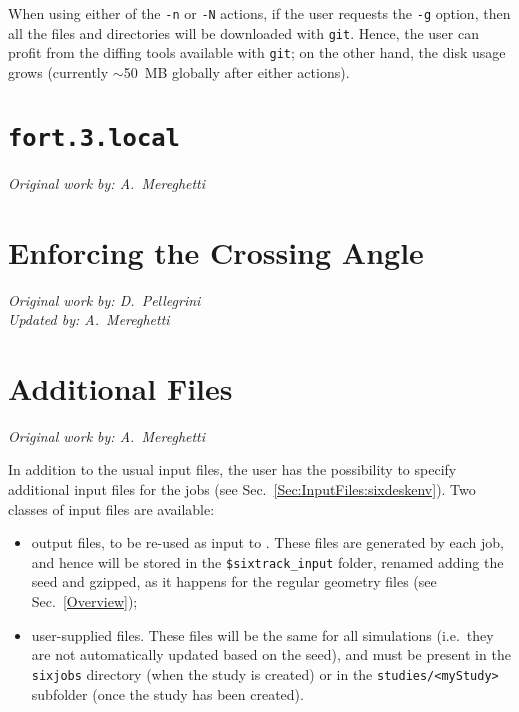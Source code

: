 When using either of the \texttt{-n} or \texttt{-N} actions,
if the user requests the \texttt{-g} option, then all the files
and directories will be downloaded with \texttt{git}. Hence, the
user can profit from the diffing tools available with \texttt{git};
on the other hand, the disk usage grows (currently $\sim$50~MB
globally after either actions).

\section{\texttt{fort.3.local}} \label{fort3local}
\begin{flushright}
\emph{Original work by: A.~Mereghetti}
\end{flushright}

\section{Enforcing the Crossing Angle} \label{EnforceXingAngle}
\begin{flushright}
\emph{Original work by: D.~Pellegrini} \\
\emph{Updated by: A.~Mereghetti}
\end{flushright}

\section{Additional Files} \label{Sec:AdditionalFiles}
\begin{flushright}
\emph{Original work by: A.~Mereghetti}
\end{flushright}
In addition to the usual input \SIXTRACK{} files, the user has the
possibility to specify additional input files for the \SIXTRACK{} jobs
(see Sec.~\ref{Sec:InputFiles:sixdeskenv}).
Two classes of input files are available:
\begin{itemize}
\item \MADX{} output files, to be re-used as input to \SIXTRACK{}.
  These files are generated by each \MADX{} job, and hence will be stored in
  the \texttt{\$sixtrack\_input} folder, renamed  adding the seed and gzipped,
  as it happens for the regular geometry files (see Sec.~\ref{Overview});
\item user-supplied files. These files will be the same for all simulations
  (i.e.~they are not automatically updated based on the seed), and must be
  present in the \texttt{sixjobs} directory (when the study is created) or
  in the \texttt{studies/<myStudy>} subfolder (once the study has been created).
\end{itemize}

